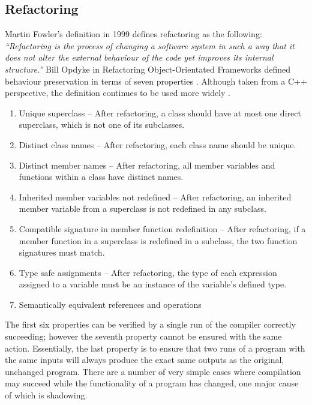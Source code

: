 \subsection{Refactoring}

Martin Fowler's definition in 1999 \cite{fowler99} defines refactoring as the following: \emph{``Refactoring is the process of changing a software system in such a way that it does not alter the external behaviour of the code yet improves its internal structure.''} Bill Opdyke in Refactoring Object-Orientated Frameworks defined behaviour preservation in terms of seven properties \cite{opdyke1992refactoring}. Although taken from a C++ perspective, the definition continues to be used more widely \cite{schafer2010specification}.

\begin{enumerate}
\item Unique superclass -- After refactoring, a class should have at most one direct superclass, which is not one of its subclasses.
\item Distinct class names -- After refactoring, each class name should be unique.
\item Distinct member names --  After refactoring, all member variables and functions within a class have distinct names.
\item Inherited member variables not redefined -- After refactoring, an inherited member variable from a superclass is not redefined in any subclass.
\item Compatible signature in member function redefinition -- After refactoring, if a member function in a superclass is redefined in a subclass, the two function signatures must match.
\item Type safe assignments -- After refactoring, the type of each expression assigned to a variable must be an instance of the variable's defined type.
\item Semantically equivalent references and operations
\end{enumerate}

The first six properties can be verified by a single run of the compiler correctly succeeding; however the seventh property cannot be ensured with the same action. Essentially, the last property is to ensure that two runs of a program with the same inputs will always produce the exact same outputs as the original, unchanged program. There are a number of very simple cases where compilation may succeed while the functionality of a program has changed, one major cause of which is shadowing. 

